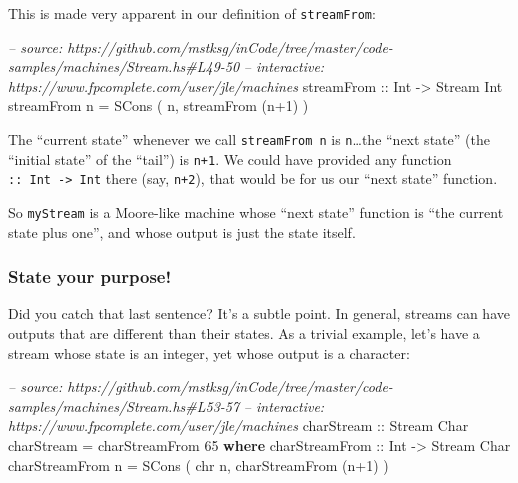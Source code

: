 \documentclass[]{article}
\newenvironment{Shaded}{\begin{snugshade}}{\end{snugshade}}
\newcommand{\CommentTok}[1]{\textcolor[rgb]{0.56,0.35,0.01}{\textit{#1}}}
\newcommand{\DataTypeTok}[1]{\textcolor[rgb]{0.13,0.29,0.53}{#1}}
\newcommand{\DecValTok}[1]{\textcolor[rgb]{0.00,0.00,0.81}{#1}}
\newcommand{\FunctionTok}[1]{\textcolor[rgb]{0.00,0.00,0.00}{#1}}
\newcommand{\KeywordTok}[1]{\textcolor[rgb]{0.13,0.29,0.53}{\textbf{#1}}}
\newcommand{\NormalTok}[1]{#1}
\newcommand{\OtherTok}[1]{\textcolor[rgb]{0.56,0.35,0.01}{#1}}
\begin{document}
This is made very apparent in our definition of \texttt{streamFrom}:

\begin{Shaded}
\begin{Highlighting}[]
\CommentTok{-- source: https://github.com/mstksg/inCode/tree/master/code-samples/machines/Stream.hs#L49-50}
\CommentTok{-- interactive: https://www.fpcomplete.com/user/jle/machines}
\OtherTok{    streamFrom ::} \DataTypeTok{Int} \OtherTok{->} \DataTypeTok{Stream} \DataTypeTok{Int}
\NormalTok{    streamFrom n }\FunctionTok{=} \DataTypeTok{SCons}\NormalTok{ ( n, streamFrom (n}\FunctionTok{+}\DecValTok{1}\NormalTok{) )}
\end{Highlighting}
\end{Shaded}

The ``current state'' whenever we call \texttt{streamFrom\ n} is
\texttt{n}\ldots{}the ``next state'' (the ``initial state'' of the ``tail'') is
\texttt{n+1}. We could have provided any function
\texttt{::\ Int\ -\textgreater{}\ Int} there (say, \texttt{n+2}), that would be
for us our ``next state'' function.

So \texttt{myStream} is a Moore-like machine whose ``next state'' function is
``the current state plus one'', and whose output is just the state itself.

\hypertarget{state-your-purpose}{%
\subsubsection{State your purpose!}\label{state-your-purpose}}

Did you catch that last sentence? It's a subtle point. In general, streams can
have outputs that are different than their states. As a trivial example, let's
have a stream whose state is an integer, yet whose output is a character:

\begin{Shaded}
\begin{Highlighting}[]
\CommentTok{-- source: https://github.com/mstksg/inCode/tree/master/code-samples/machines/Stream.hs#L53-57}
\CommentTok{-- interactive: https://www.fpcomplete.com/user/jle/machines}
\OtherTok{charStream ::} \DataTypeTok{Stream} \DataTypeTok{Char}
\NormalTok{charStream }\FunctionTok{=}\NormalTok{ charStreamFrom }\DecValTok{65}
  \KeywordTok{where}
\OtherTok{    charStreamFrom ::} \DataTypeTok{Int} \OtherTok{->} \DataTypeTok{Stream} \DataTypeTok{Char}
\NormalTok{    charStreamFrom n }\FunctionTok{=} \DataTypeTok{SCons}\NormalTok{ ( chr n, charStreamFrom (n}\FunctionTok{+}\DecValTok{1}\NormalTok{) )}
\end{Highlighting}
\end{Shaded}
\end{document}
